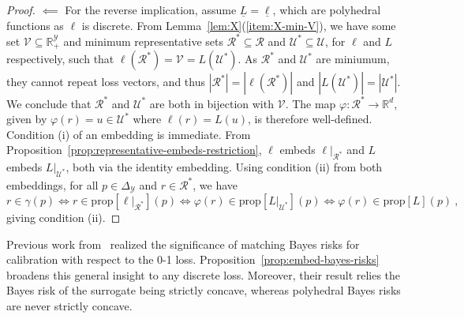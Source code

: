 \documentclass[11pt]{article}
\newcommand{\Comments}{1}
\newcommand{\mynote}[2]{\ifnum\Comments=1\textcolor{#1}{#2}\fi}
\newcommand{\mytodo}[2]{\ifnum\Comments=1%
  \todo[linecolor=#1!80!black,backgroundcolor=#1,bordercolor=#1!80!black]{#2}\fi}
\newcommand{\raft}[1]{\mytodo{green!20!white}{RF: #1}}
\newcommand{\jessie}[1]{\mynote{teal}{[JF: #1]}}
\newcommand{\jessiet}[1]{\mytodo{teal!20!white}{JF: #1}}
\newcommand{\btw}[1]{\mytodo{gray!20!white}{BTW: #1}}%
\newcommand{\reals}{\mathbb{R}}
\newcommand{\prop}[1]{\mathrm{prop}[#1]}
\newcommand{\simplex}{\Delta_\Y}
\newcommand{\R}{\mathcal{R}}
\newcommand{\Sc}{\mathcal{S}}
\newcommand{\U}{\mathcal{U}}
\newcommand{\V}{\mathcal{V}}
\newcommand{\Y}{\mathcal{Y}}
\newcommand{\risk}[1]{\underline{#1}}
\DeclareMathOperator*{\sgn}{sgn}
\begin{document}
\begin{proof}
  $\impliedby$
	For the reverse implication, assume $\risk{L} = \risk{\ell}$, which are polyhedral functions as $\ell$ is discrete.
  From Lemma~\ref{lem:X}(\ref{item:X-min-V}), we have some set $\V\subseteq\reals^\Y_+$ and minimum representative sets $\R^* \subseteq \R$ and $\U^* \subseteq \U$, for $\ell$ and $L$ respectively, such that $\ell(\R^*) = \V = L(\U^*)$.
  As $\R^*$ and $\U^*$ are miniumum, they cannot repeat loss vectors, and thus $|\R^*|=|\ell(\R^*)|$ and $|L(\U^*)|=|\U^*|$.
  We conclude that $\R^*$ and $\U^*$ are both in bijection with $\V$.
  The map $\varphi :\R^* \to \reals^d$, given by $\varphi(r) = u \in \U^*$ where $\ell(r) = L(u)$, is therefore well-defined.
  Condition (i) of an embedding is immediate.
  From Proposition~\ref{prop:representative-embeds-restriction}, $\ell$ embeds $\ell|_{\R^*}$ and $L$ embeds $L|_{\U^*}$, both via the identity embedding.
  Using condition (ii) from both embeddings, for all $p\in\simplex$ and $r\in\R^*$, we have
  \begin{equation*}
    r \in \gamma(p) \iff r \in \prop{\ell|_{\R^*}}(p) \iff \varphi(r) \in \prop{L|_{\U^*}}(p)
    \iff \varphi(r) \in \prop{L}(p)~,
  \end{equation*}
  giving condition (ii).
\end{proof}



Previous work from~\citet[Proposition 4]{duchi2018multiclass} realized the significance of matching Bayes risks for calibration with respect to the 0-1 loss.
Proposition~\ref{prop:embed-bayes-risks} broadens this general insight to any discrete loss.
Moreover, their result relies the Bayes risk of the surrogate being strictly concave, whereas polyhedral Bayes risks are never strictly concave.
\end{document}
